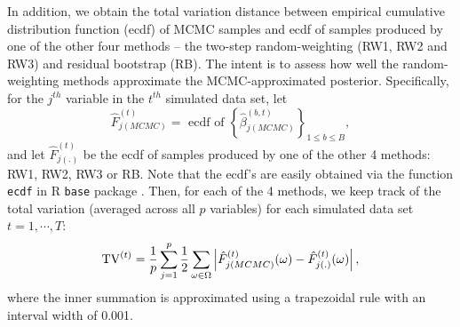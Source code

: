 \documentclass[ejs,authoryear,linksfromyear]{imsart}
\numberwithin{equation}{section}
\theoremstyle{plain}
\begin{document}
In addition, we obtain the total variation distance between empirical cumulative distribution function (ecdf) of MCMC samples and ecdf of samples produced by one of the other four methods -- the two-step random-weighting (RW1, RW2 and RW3) and residual bootstrap (RB).  The intent is to assess how well the random-weighting methods approximate the MCMC-approximated posterior. Specifically, for the $j^{th}$ variable in the $t^{th}$ simulated data set, let 
$$
\hat{F}_{j(MCMC)}^{(t)} = \text{ ecdf of }
\left\{ \widehat{\beta}_{j(MCMC)}^{(b,t)} \right\}_{1 \leq b \leq B},
$$
and let $\hat{F}_{j(.)}^{(t)}$ be the ecdf of samples produced by one of the other 4 methods: RW1, RW2, RW3 or RB. Note that the ecdf's are easily obtained via the function \texttt{ecdf} in R \texttt{base} package \citep{R}. Then, for each of the 4 methods, we keep track of the total variation (averaged across all $p$ variables) for each simulated data set $t = 1, \cdots, T$:
$$
{\rm TV}^{(t)} = \dfrac{1}{p} \sum_{j=1}^p
\dfrac{1}{2}
\sum_{\omega \in \Omega}
\left\vert
\hat{F}_{j(MCMC)}^{(t)} (\omega)
- \hat{F}_{j(.)}^{(t)} (\omega)
\right\vert,
$$     
where the inner summation is approximated using a trapezoidal rule with an interval width of 0.001. 
\end{document}
